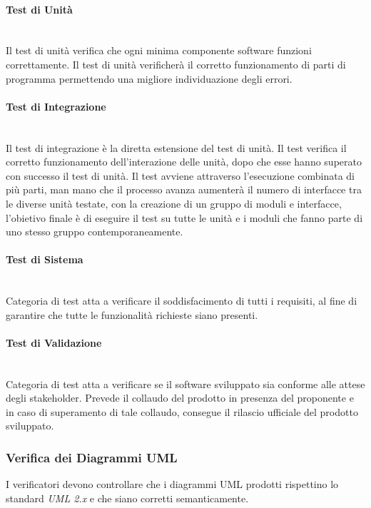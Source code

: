 \paragraph{Test di Unità} \-\\
Il test di unità verifica che ogni minima componente software funzioni correttamente. Il test di unità verificherà il corretto funzionamento di parti di programma permettendo una migliore individuazione degli errori.

\paragraph{Test di Integrazione}\-\\
Il test di integrazione è la diretta estensione del test di unità. Il test verifica il corretto funzionamento dell'interazione delle unità, dopo che esse hanno superato con successo il test di unità. Il test avviene attraverso l'esecuzione combinata di più parti, man mano che il processo avanza aumenterà il numero di interfacce tra le diverse unità testate, con la creazione di un gruppo di moduli e interfacce, l'obietivo finale è di eseguire il test su tutte le unità e i moduli che fanno parte di uno stesso gruppo contemporaneamente.


\paragraph{Test di Sistema}\-\\
Categoria di test atta a verificare il soddisfacimento di tutti i requisiti, al fine di garantire che tutte le funzionalità richieste siano presenti.

\paragraph{Test di Validazione} \-\\
Categoria di test atta a verificare se il software sviluppato sia conforme alle attese degli stakeholder.  Prevede il collaudo del prodotto in presenza del proponente e in caso di superamento di tale collaudo, consegue il rilascio ufficiale del prodotto sviluppato.

\subsubsection{Verifica dei Diagrammi UML}
I verificatori devono controllare che i diagrammi UML prodotti rispettino lo standard \textit{UML 2.x} e che siano corretti semanticamente.

